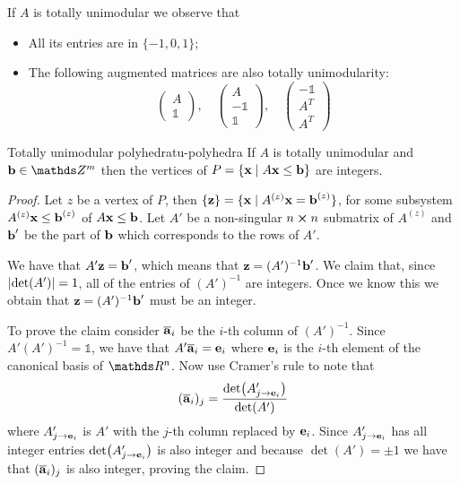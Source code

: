 \documentclass[12pt]{extarticle}
\renewcommand{\vec}[1]{\bvec{#1}}
\begin{document}
\begin{remark}{}{}
	If $A$ is totally unimodular we observe that
	\begin{itemize}
		\item All its entries are in $\{-1, 0, 1\}$;
		\item The following augmented matrices are also totally unimodularity:
		      \begin{equation}
			      \begin{pmatrix}
				      A \\ \mathds 1
			      \end{pmatrix},
			      \quad
			      \begin{pmatrix}
				      A \\ - \mathds 1 \\ \mathds 1
			      \end{pmatrix},
			      \quad
			      \begin{pmatrix}
				      - \mathds 1 \\ A^T \\ A^T
			      \end{pmatrix}
		      \end{equation}
	\end{itemize}
\end{remark}

\begin{theorem}{Totally unimodular polyhedra}{tu-polyhedra}
	If $A$ is totally unimodular and $\vec b \in \Z^m$ then the vertices of
	$P = \{ \vec x \mid A \vec x \leq \vec b \}$ are integers.
\end{theorem}

\begin{proof}
	Let $z$ be a vertex of $P$, then $\{ \vec z \} = \{ \vec x \mid A^{(z)} \vec x = \vec b^{(z)}\}$,
	for some subsystem $A^{(z)} \vec x \leq \vec b^{(z)}$ of $A \vec x \leq \vec b$.
	Let $A'$ be a non-singular $n\cross n$ submatrix of $A^{(z)}$ and $\vec b'$ be the part of
	$\vec b$ which corresponds to the rows of $A'$.

	We have that $A' \vec z = \vec b'$, which means that $\vec z = (A')^{-1} \vec b'$.
	We claim that, since $\abs{\det (A')} = 1$, all of the entries of $(A')^{-1}$ are integers.
	Once we know this we obtain that $\vec z = (A')^{-1} \vec b'$ must be an integer.

	To prove the claim consider $\overline{\vec a}_i$ be the $i$-th column of $(A')^{-1}$.
	Since $A'(A')^{-1} = \mathds 1$, we have that $A' \overline{\vec a}_i = \vec e_i$ where $\vec e_i$
	is the $i$-th element of the canonical basis of $\R^n$.
	Now use Cramer's rule to note that
	\begin{equation}
		(\overline{\vec a}_i)_j = \frac{\det(A'_{j \to \vec e_i})}{\det(A')}
	\end{equation}
	where $A'_{j \to \vec e_i}$ is $A'$ with the $j$-th column replaced by $\vec e_i$.
	Since $A'_{j \to \vec e_i}$ has all integer entries $\det(A'_{j \to \vec e_i})$ is also integer
	and because $\det(A') = \pm 1$ we have that $(\overline{\vec a}_i)_j$ is also integer, proving the
	claim.
\end{proof}
\end{document}
